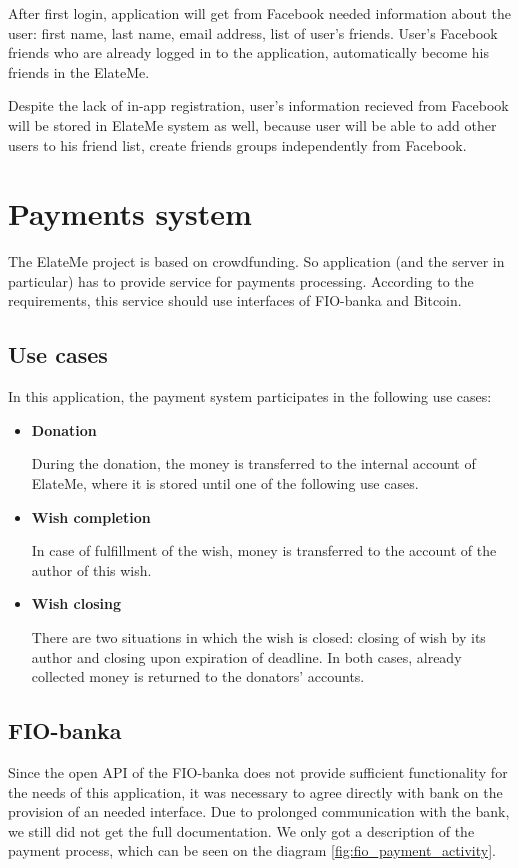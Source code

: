 After first login, application will get from Facebook needed information about the user: first name, last name,
email address, list of user's friends. User's Facebook friends who are already logged in to the application,
automatically become his friends in the ElateMe.

Despite the lack of in-app registration, user's information recieved from Facebook will be stored in ElateMe system
as well, because user will be able to add other users to his friend list, create friends groups independently from
Facebook.



\newcommand{\uitem}[1]{
\item \textbf{#1} \par
}
\newcommand{\aitem}[1]{
\item \textbf{#1} \par
}
\section{Payments system}
The ElateMe project is based on crowdfunding. So application (and the server in particular) has to provide service for
payments processing. According to the requirements, this service should use interfaces of FIO-banka and Bitcoin.

\subsection{Use cases}
In this application, the payment system participates in the following use cases:

\begin{itemize}
\uitem{Donation}
During the donation, the money is transferred to the internal account of ElateMe, where it is stored until one of
the following use cases.

\uitem{Wish completion}
In case of fulfillment of the wish, money is transferred to the account of the author of this wish.

\uitem{Wish closing}
There are two situations in which the wish is closed: closing of wish by its author and closing upon expiration of
deadline. In both cases, already collected money is returned to the donators' accounts.
\end{itemize}

\subsection{FIO-banka}
Since the open \ac{API} of the FIO-banka \cite{fio} does not provide sufficient functionality for the needs of this
application, it was necessary to agree directly with bank on the provision of an needed interface. Due to prolonged
communication with the bank, we still did not get the full documentation. We only got a description of the payment
process, which can be seen on the diagram \ref{fig:fio_payment_activity}.


